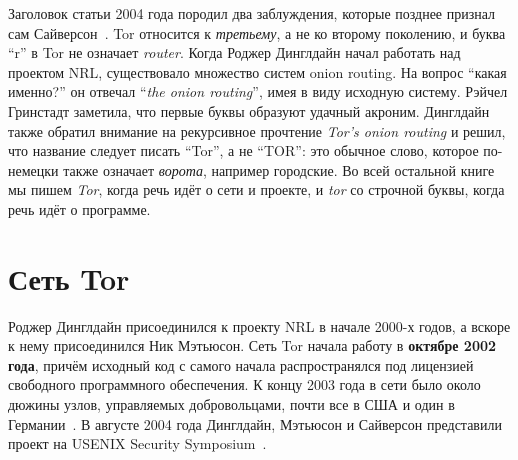 \begin{storia}[Название]
Заголовок статьи 2004 года  породил два заблуждения, которые позднее признал сам Сайверсон~\cite{syverson2011peel}. Tor относится к \emph{третьему}, а не ко второму поколению, и буква \enquote{r} в Tor не означает \emph{router}. Когда Роджер Динглдайн начал работать над проектом NRL, существовало множество систем onion routing. На вопрос \enquote{какая именно?} он отвечал \enquote{\emph{the onion routing}}, имея в виду исходную систему. Рэйчел Гринстадт заметила, что первые буквы образуют удачный акроним. Динглдайн также обратил внимание на рекурсивное прочтение \emph{Tor's onion routing} и решил, что название следует писать \enquote{Tor}, а не \enquote{TOR}: это обычное слово, которое по-немецки также означает \emph{ворота}, например городские. Во всей остальной книге мы пишем \emph{Tor}, когда речь идёт о сети и проекте, и \emph{tor} со строчной буквы, когда речь идёт о программе.
\end{storia}

\section{Сеть Tor}\label{sec:nascita-rete}

Роджер Динглдайн присоединился к проекту NRL в начале 2000-х годов, а вскоре к нему присоединился Ник Мэтьюсон. Сеть Tor начала работу в \textbf{октябре 2002 года}, причём исходный код с самого начала распространялся под лицензией свободного программного обеспечения. К концу 2003 года в сети было около дюжины узлов, управляемых добровольцами, почти все в США и один в Германии~\cite{torhistory}. В августе 2004 года Динглдайн, Мэтьюсон и Сайверсон представили проект на USENIX Security Symposium~\cite{dingledine2004tor}.

